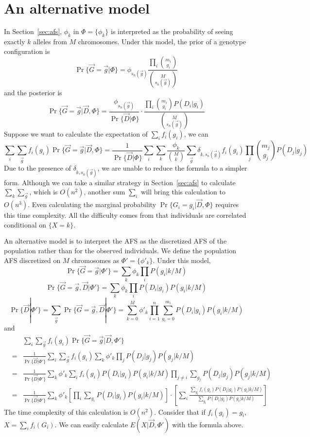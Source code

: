 \documentclass[pdftex,10pt]{book}
\begin{document}
\section{An alternative model}
In Section~\ref{sec:afs}, $\phi_k$ in $\Phi=\{\phi_k\}$ is interpreted
as the probability of seeing exactly $k$ alleles from $M$
chromosomes. Under this model, the prior of a genotype configuration is
$$
\Pr\{\vec{G}=\vec{g}|\Phi\}=\phi_{s_n(\vec{g})}\frac{\prod_i\binom{m_i}{g_i}}{\binom{M}{s_n(\vec{g})}}
$$
and the posterior is
$$
\Pr\{\vec{G}=\vec{g}|\vec{D},\Phi\}=\frac{\phi_{s_n(\vec{g})}}{\Pr\{\vec{D}|\Phi\}}\cdot\frac{\prod_i\binom{m_i}{g_i}P(D_i|g_i)}{\binom{M}{s_n(\vec{g})}}
$$
Suppose we want to calculate the expectation of $\sum_if_i(g_i)$, we can
$$
\sum_i\sum_{\vec{g}}f_i(g_i)\Pr\{\vec{G}=\vec{g}|\vec{D},\Phi\}
=\frac{1}{\Pr\{\vec{D}|\Phi\}}\sum_i\sum_k\frac{\phi_k}{\binom{M}{k}}\sum_{\vec{g}}\delta_{k,s_n(\vec{g})}f_i(g_i)\prod_j\binom{m_j}{g_j}P(D_j|g_j)
$$
Due to the presence of $\delta_{k,s_n(\vec{g})}$, we are unable to
reduce the formula to a simpler form. Although we can take a similar
strategy in Section~\ref{sec:afs} to calculate $\sum_k\sum_{\vec{g}}$,
which is $O(n^2)$, another sum $\sum_i$ will bring this calculation to
$O(n^3)$. Even calculating the marginal probability
$\Pr\{G_i=g_i|\vec{D},\Phi\}$ requires this time complexity. All the
difficulty comes from that individuals are correlated conditional on
$\{X=k\}$.

An alternative model is to interpret the AFS as the discretized AFS of
the population rather than for the observed individuals. We define the
population AFS discretized on $M$ chromosomes as
$\Phi'=\{\phi'_k\}$. Under this model,
$$
\Pr\{\vec{G}=\vec{g}|\Phi'\}=\sum_k\phi_k\prod_iP(g_i|k/M)
$$
$$
\Pr\{\vec{G}=\vec{g},\vec{D}|\Phi'\}=\sum_k\phi_k\prod_iP(D_i|g_i)P(g_i|k/M)
$$
$$
\Pr\{\vec{D}|\Phi'\}=\sum_{\vec{g}}\Pr\{\vec{G}=\vec{g},\vec{D}|\Phi'\}
=\sum_{k=0}^M\phi'_k\prod_{i=1}^n\sum_{g_i=0}^{m_i}P(D_i|g_i)P(g_i|k/M)
$$
and
\begin{eqnarray}\label{equ:fexp}
&&\sum_i\sum_{\vec{g}}f_i(g_i)\Pr\{\vec{G}=\vec{g}|\vec{D},\Phi'\}\\\nonumber
&=&\frac{1}{\Pr\{\vec{D}|\Phi'\}}\sum_i\sum_{\vec{g}}f_i(g_i)\sum_k\phi'_k\prod_jP(D_j|g_j)P(g_j|k/M)\\\nonumber
&=&\frac{1}{\Pr\{\vec{D}|\Phi'\}}\sum_k\phi'_k\sum_if_i(g_i)P(D_i|g_i)P(g_i|k/M)\prod_{j\not=i}\sum_{g_j}P(D_j|g_j)P(g_j|k/M)\\\nonumber
&=&\frac{1}{\Pr\{\vec{D}|\Phi'\}}\sum_k\phi'_k\left[\prod_i\sum_{g_i}P(D_i|g_i)P(g_i|k/M)\right]\cdot\left[\sum_i\frac{\sum_{g_i}f_i(g_i)P(D_i|g_i)P(g_i|k/M)}{\sum_{g_i}P(D_i|g_i)P(g_i|k/M)}\right]
\end{eqnarray}
The time complexity of this calculation is $O(n^2)$. Consider that if
$f_i(g_i)=g_i$, $X=\sum_if_i(G_i)$. We can easily calculate
$E(X|\vec{D},\Phi')$ with the formula above.
\end{document}
